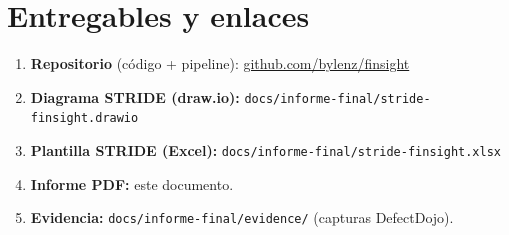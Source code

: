 \documentclass[11pt,a4paper]{article}
\begin{document}
\section{Entregables y enlaces}
\begin{enumerate}[label=\arabic*.]
  \item \textbf{Repositorio} (código + pipeline): \href{https://github.com/bylenz/finsight}{github.com/bylenz/finsight}
  \item \textbf{Diagrama STRIDE (draw.io):} \texttt{docs/informe-final/stride-finsight.drawio}
  \item \textbf{Plantilla STRIDE (Excel):} \texttt{docs/informe-final/stride-finsight.xlsx}
  \item \textbf{Informe PDF:} este documento.
  \item \textbf{Evidencia:} \texttt{docs/informe-final/evidence/} (capturas DefectDojo).
\end{enumerate}
\end{document}
